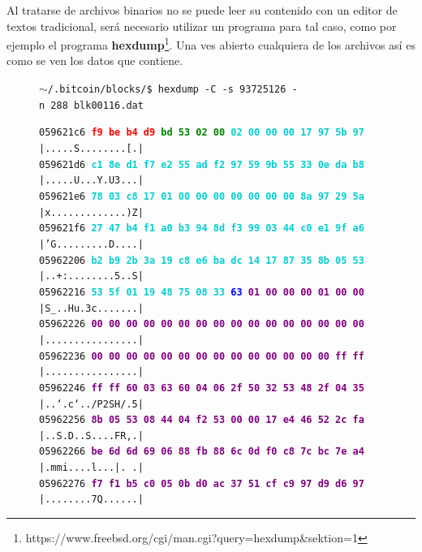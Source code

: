 \documentclass{article}
\begin{document}
    Al tratarse de archivos binarios no se puede leer su contenido con un editor de textos tradicional, será necesario utilizar un programa para tal caso, como por ejemplo el programa \textbf{hexdump}\footnote{https://www.freebsd.org/cgi/man.cgi?query=hexdump\&sektion=1}. Una ves abierto cualquiera de los archivos así es como se ven los datos que contiene.
    \begin{figure}[H]
    \scriptsize{\texttt{$\sim$/.bitcoin/blocks/\$ hexdump\ -C\ -s\ 93725126\ -n\ 288\ blk00116.dat}}
    
    \scriptsize{
    \texttt{059621c6  \textbf{\textcolor{red}{f9 be b4 d9} \textcolor{green}{bd 53 02 00}  \textcolor{darkTurquoise}{02 00 00 00 17 97 5b 97}}  |.....S........[.|} \\
    \texttt{059621d6  \textbf{\textcolor{darkTurquoise}{c1 8e d1 f7 e2 55 ad f2  97 59 9b 55 33 0e da b8}}  |.....U...Y.U3...|} \\
    \texttt{059621e6  \textbf{\textcolor{darkTurquoise}{78 03 c8 17 01 00 00 00  00 00 00 00 8a 97 29 5a}}  |x.............)Z|} \\
    \texttt{059621f6  \textbf{\textcolor{darkTurquoise}{27 47 b4 f1 a0 b3 94 8d  f3 99 03 44 c0 e1 9f a6}}  |'G.........D....|} \\
    \texttt{05962206  \textbf{\textcolor{darkTurquoise}{b2 b9 2b 3a 19 c8 e6 ba  dc 14 17 87 35 8b 05 53}}  |..+:........5..S|} \\
    \texttt{05962216  \textbf{\textcolor{darkTurquoise}{53 5f 01 19 48 75 08 33}  \textcolor{blue}{63} \textcolor{purple}{01 00 00 00 01 00 00}}  |S\_..Hu.3c.......|} \\
    \texttt{05962226  \textbf{\textcolor{purple}{00 00 00 00 00 00 00 00  00 00 00 00 00 00 00 00}}  |................|} \\
    \texttt{05962236  \textbf{\textcolor{purple}{00 00 00 00 00 00 00 00  00 00 00 00 00 00 ff ff}}  |................|} \\
    \texttt{05962246  \textbf{\textcolor{purple}{ff ff 60 03 63 60 04 06  2f 50 32 53 48 2f 04 35}}  |..`.c`../P2SH/.5|} \\
    \texttt{05962256  \textbf{\textcolor{purple}{8b 05 53 08 44 04 f2 53  00 00 17 e4 46 52 2c fa}}  |..S.D..S....FR,.|} \\
    \texttt{05962266  \textbf{\textcolor{purple}{be 6d 6d 69 06 88 fb 88  6c 0d f0 c8 7c bc 7e a4}}  |.mmi....l...|.~.|} \\
    \texttt{05962276  \textbf{\textcolor{purple}{f7 f1 b5 c0 05 0b d0 ac  37 51 cf c9 97 d9 d6 97}}  |........7Q......|} \\
}
\end{figure}
\end{document}
